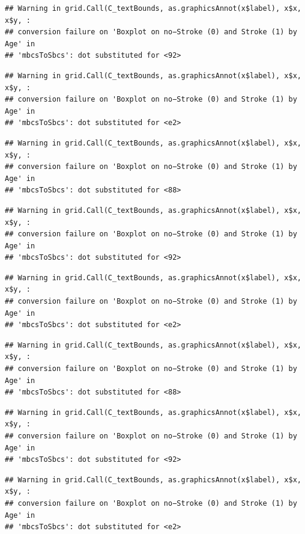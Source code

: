 \documentclass[
]{article}
\renewcommand{\=}[1]{\stackrel{#1}{=}}
\theoremstyle{definition}
\theoremstyle{remark}
\begin{document}
\begin{verbatim}
## Warning in grid.Call(C_textBounds, as.graphicsAnnot(x$label), x$x, x$y, :
## conversion failure on 'Boxplot on no−Stroke (0) and Stroke (1) by Age' in
## 'mbcsToSbcs': dot substituted for <92>
\end{verbatim}

\begin{verbatim}
## Warning in grid.Call(C_textBounds, as.graphicsAnnot(x$label), x$x, x$y, :
## conversion failure on 'Boxplot on no−Stroke (0) and Stroke (1) by Age' in
## 'mbcsToSbcs': dot substituted for <e2>
\end{verbatim}

\begin{verbatim}
## Warning in grid.Call(C_textBounds, as.graphicsAnnot(x$label), x$x, x$y, :
## conversion failure on 'Boxplot on no−Stroke (0) and Stroke (1) by Age' in
## 'mbcsToSbcs': dot substituted for <88>
\end{verbatim}

\begin{verbatim}
## Warning in grid.Call(C_textBounds, as.graphicsAnnot(x$label), x$x, x$y, :
## conversion failure on 'Boxplot on no−Stroke (0) and Stroke (1) by Age' in
## 'mbcsToSbcs': dot substituted for <92>
\end{verbatim}

\begin{verbatim}
## Warning in grid.Call(C_textBounds, as.graphicsAnnot(x$label), x$x, x$y, :
## conversion failure on 'Boxplot on no−Stroke (0) and Stroke (1) by Age' in
## 'mbcsToSbcs': dot substituted for <e2>
\end{verbatim}

\begin{verbatim}
## Warning in grid.Call(C_textBounds, as.graphicsAnnot(x$label), x$x, x$y, :
## conversion failure on 'Boxplot on no−Stroke (0) and Stroke (1) by Age' in
## 'mbcsToSbcs': dot substituted for <88>
\end{verbatim}

\begin{verbatim}
## Warning in grid.Call(C_textBounds, as.graphicsAnnot(x$label), x$x, x$y, :
## conversion failure on 'Boxplot on no−Stroke (0) and Stroke (1) by Age' in
## 'mbcsToSbcs': dot substituted for <92>
\end{verbatim}

\begin{verbatim}
## Warning in grid.Call(C_textBounds, as.graphicsAnnot(x$label), x$x, x$y, :
## conversion failure on 'Boxplot on no−Stroke (0) and Stroke (1) by Age' in
## 'mbcsToSbcs': dot substituted for <e2>
\end{verbatim}
\end{document}
